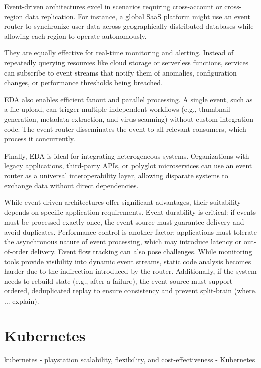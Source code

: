 \documentclass[]{final}
\begin{document}
Event-driven architectures excel in scenarios requiring cross-account or
cross-region data replication. For instance, a global SaaS platform might use
an event router to synchronize user data across geographically distributed
databases while allowing each region to operate autonomously.

They are equally effective for real-time monitoring and alerting. Instead of
repeatedly querying resources like cloud storage or serverless functions,
services can subscribe to event streams that notify them of anomalies,
configuration changes, or performance thresholds being breached.

EDA also enables efficient fanout and parallel processing. A single event,
such as a file upload, can trigger multiple independent workflows (e.g.,
thumbnail generation, metadata extraction, and virus scanning) without custom
integration code. The event router disseminates the event to all relevant
consumers, which process it concurrently.

Finally, EDA is ideal for integrating heterogeneous systems. Organizations with
legacy applications, third-party APIs, or polyglot microservices can use an
event router as a universal interoperability layer, allowing disparate
systems to exchange data without direct dependencies.

While event-driven architectures offer significant advantages, their suitability
depends on specific application requirements. Event durability is critical:
if events must be processed exactly once, the event source must guarantee
delivery and avoid duplicates. Performance control is another factor;
applications must tolerate the asynchronous nature of event processing, which
may introduce latency or out-of-order delivery. Event flow tracking can also
pose challenges. While monitoring tools provide visibility into dynamic event
streams, static code analysis becomes harder due to the indirection
introduced by the router. Additionally, if the system needs to rebuild
state (e.g., after a failure), the event source must support ordered,
deduplicated replay to ensure consistency and prevent split-brain
(where, ... explain).

\section{Kubernetes}

kubernetes - playstation
scalability, flexibility, and cost-effectiveness - Kubernetes
\end{document}
